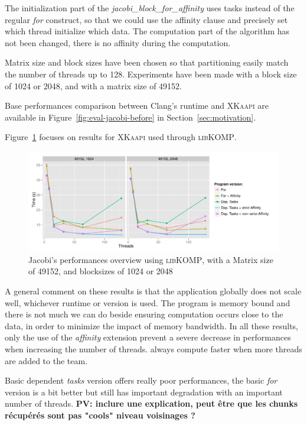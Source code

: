 \documentclass{Styles/llncs}
\newcommand{\kaapi}{\textsc{\mbox{XKaapi}}\xspace}
\newcommand{\libXKOMP}{\textsc{libKOMP}\xspace}
\newcommand{\PV}[1]{{\color{purple}\bfseries PV: #1}}
\begin{document}
The initialization part of the \textit{jacobi\_block\_for\_affinity} uses tasks
instead of the regular \emph{for} construct, so that we could use the affinity clause and precisely
set which thread initialize which data.
The computation part of the algorithm has not been changed, there is no affinity
during the computation.

Matrix size and block sizes have been chosen so that partitioning easily match
the number of threads up to 128. Experiments have been made with a block size of 1024
or 2048, and with a matrix size of 49152.

Base performances comparison between Clang's runtime and \kaapi are available in Figure~\ref{fig:eval-jacobi-before} in Section~\ref{sec:motivation}.

Figure~\ref{fig:eval-jacobi} focuses on results for \kaapi used through \libXKOMP.

\begin{figure}[t]
  \centering
  \includegraphics[scale=0.6]{graphs/jacobi_scale.pdf}
  \caption{Jacobi's performances overview using \libXKOMP, with a Matrix size of 49152, and blocksizes of 1024 or 2048}
\label{fig:eval-jacobi}
\end{figure}

A general comment on these results is that the application globally does not scale well, whichever runtime or version is used.
The program is memory bound and there is not much we can do beside ensuring computation occurs
close to the data, in order to minimize the impact of memory bandwidth.
In all these results, only the use of the \emph{affinity} extension prevent
a severe decrease in performances when increasing the number of threads.
always compute faster when more threads are added to the team.

Basic dependent \emph{tasks} version offers really poor performances, the basic
\emph{for} version is a bit better but still has important degradation with an
important number of threads.
\PV{inclure une explication, peut être que les chunks récupérés sont pas "cools" niveau voisinages ?}
\end{document}
